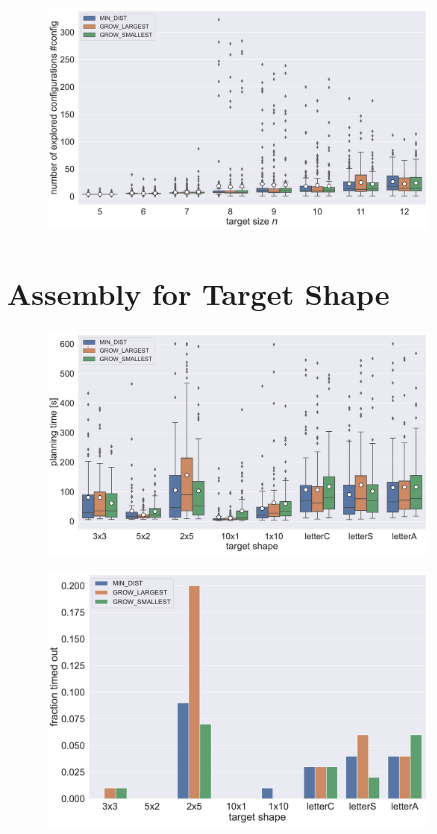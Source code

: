 \begin{figure}
	\centering
	\includegraphics[width=0.9\textwidth]{figures/plots/AFN_nconfig.pdf}
	\caption[]{}
	\label{fig:AFN_nconfig}
\end{figure}




\section{Assembly for Target Shape}

\begin{figure}
	\centering
	\includegraphics[width=0.9\textwidth]{figures/plots/AFTS_time.pdf}
	\caption[]{}
	\label{fig:AFTS_time}
\end{figure}

\begin{figure}
	\centering
	\includegraphics[width=0.9\textwidth]{figures/plots/AFTS_timeout.pdf}
	\caption[]{}
	\label{fig:AFTS_timeout}
\end{figure}




